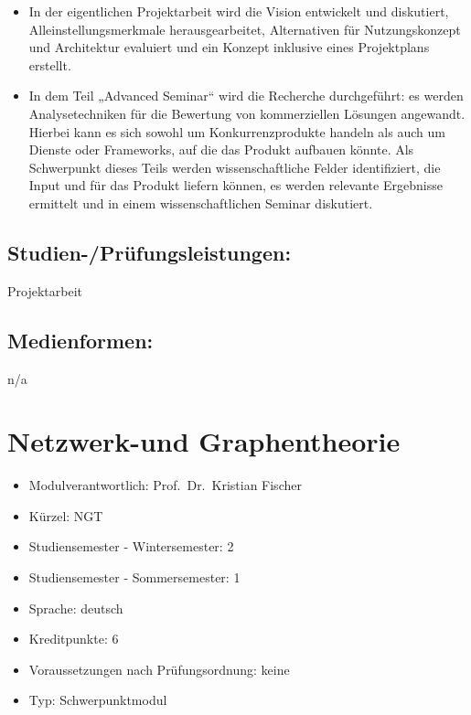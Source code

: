 \begin{itemize}
\tightlist
\item
  In der eigentlichen Projektarbeit wird die Vision entwickelt und
  diskutiert, Alleinstellungsmerkmale herausgearbeitet, Alternativen für
  Nutzungskonzept und Architektur evaluiert und ein Konzept inklusive
  eines Projektplans erstellt.
\item
  In dem Teil „Advanced Seminar`` wird die Recherche durchgeführt: es
  werden Analysetechniken für die Bewertung von kommerziellen Lösungen
  angewandt. Hierbei kann es sich sowohl um Konkurrenzprodukte handeln
  als auch um Dienste oder Frameworks, auf die das Produkt aufbauen
  könnte. Als Schwerpunkt dieses Teils werden wissenschaftliche Felder
  identifiziert, die Input und für das Produkt liefern können, es werden
  relevante Ergebnisse ermittelt und in einem wissenschaftlichen Seminar
  diskutiert.
\end{itemize}

\section*{Studien-/Prüfungsleistungen:}\label{studien-pruxfcfungsleistungen-10}

Projektarbeit

\section*{Medienformen:}\label{medienformen-10}

n/a

\chapter{Netzwerk-und Graphentheorie}\label{netzwerk-und-graphentheorie}

\begin{itemize}
\tightlist
\item
  Modulverantwortlich: Prof.~Dr.~Kristian Fischer
\item
  Kürzel: NGT
\item
  Studiensemester - Wintersemester: 2
\item
  Studiensemester - Sommersemester: 1
\item
  Sprache: deutsch
\item
  Kreditpunkte: 6
\item
  Voraussetzungen nach Prüfungsordnung: keine
\item
  Typ: Schwerpunktmodul
\end{itemize}

